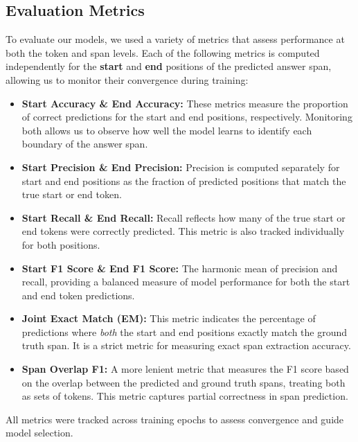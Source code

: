 \documentclass[runningheads]{llncs}
\begin{document}
\subsection{Evaluation Metrics}

To evaluate our models, we used a variety of metrics that assess performance at both the token and span levels. Each of the following metrics is computed independently for the \textbf{start} and \textbf{end} positions of the predicted answer span, allowing us to monitor their convergence during training:

\begin{itemize}
    \item \textbf{Start Accuracy \& End Accuracy:} 
    These metrics measure the proportion of correct predictions for the start and end positions, respectively. Monitoring both allows us to observe how well the model learns to identify each boundary of the answer span.

    \item \textbf{Start Precision \& End Precision:}
    Precision is computed separately for start and end positions as the fraction of predicted positions that match the true start or end token.

    \item \textbf{Start Recall \& End Recall:}
    Recall reflects how many of the true start or end tokens were correctly predicted. This metric is also tracked individually for both positions.

    \item \textbf{Start F1 Score \& End F1 Score:}
    The harmonic mean of precision and recall, providing a balanced measure of model performance for both the start and end token predictions.

    \item \textbf{Joint Exact Match (EM):}
    This metric indicates the percentage of predictions where \textit{both} the start and end positions exactly match the ground truth span. It is a strict metric for measuring exact span extraction accuracy.

    \item \textbf{Span Overlap F1:}
    A more lenient metric that measures the F1 score based on the overlap between the predicted and ground truth spans, treating both as sets of tokens. This metric captures partial correctness in span prediction.
\end{itemize}

All metrics were tracked across training epochs to assess convergence and guide model selection.
\end{document}
